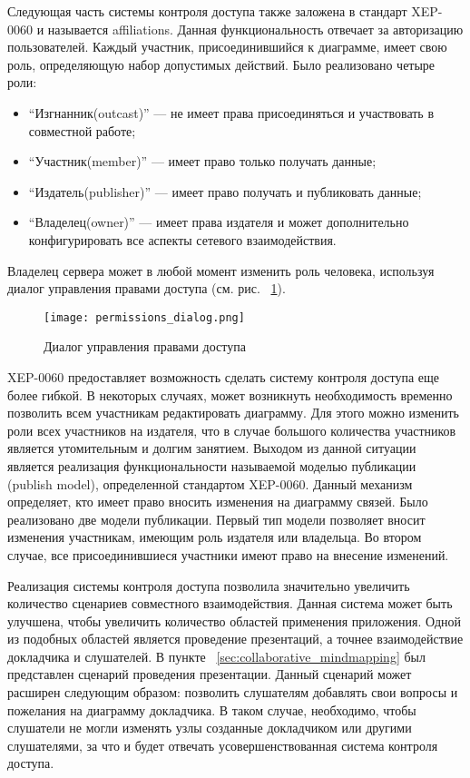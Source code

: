 Следующая часть системы контроля доступа также заложена в стандарт XEP-0060 и
называется affiliations. Данная функциональность отвечает за авторизацию
пользователей. Каждый участник, присоединившийся к диаграмме, имеет свою роль,
определяющую набор допустимых действий. Было реализовано четыре роли:
\begin{itemize}
\item ``Изгнанник(outcast)'' --- не имеет права присоединяться и участвовать в
совместной работе;
\item ``Участник(member)'' --- имеет право только получать данные;
\item ``Издатель(publisher)'' --- имеет право получать и публиковать данные;
\item ``Владелец(owner)'' ---  имеет права издателя и может дополнительно
конфигурировать все аспекты сетевого взаимодействия.
\end{itemize}
Владелец сервера может в любой момент изменить роль человека, используя диалог
управления правами доступа (см. рис. ~\ref{img:permissions_dialog}).

\begin{figure}[b] 
  \centering
  \texttt{[image: permissions\_dialog.png]}
  \caption{Диалог управления правами доступа}
  \label{img:permissions_dialog}
\end{figure}

XEP-0060 предоставляет возможность сделать систему контроля доступа еще более
гибкой. В некоторых случаях, может возникнуть необходимость временно позволить
всем участникам редактировать диаграмму. Для этого можно изменить роли всех
участников на издателя, что в случае большого количества участников является
утомительным и долгим занятием. Выходом из данной ситуации является реализация
функциональности называемой моделью публикации (publish model), определенной
стандартом XEP-0060. Данный механизм определяет, кто имеет право вносить
изменения на диаграмму связей. Было реализовано две модели публикации. Первый
тип модели позволяет вносит изменения участникам, имеющим роль издателя или
владельца. Во втором случае, все присоединившиеся участники имеют право на
внесение изменений.

Реализация системы контроля доступа позволила значительно увеличить количество
сценариев совместного взаимодействия. Данная система может быть улучшена, чтобы
увеличить количество областей применения приложения. Одной из подобных областей
является проведение презентаций, а точнее взаимодействие докладчика и
слушателей. В пункте ~\ref{sec:collaborative_mindmapping} был представлен
сценарий проведения презентации. Данный сценарий может расширен следующим
образом: позволить слушателям добавлять свои вопросы и пожелания на диаграмму
докладчика. В таком случае, необходимо, чтобы слушатели не могли изменять узлы
созданные докладчиком или другими слушателями, за что и будет отвечать
усовершенствованная система контроля доступа.
